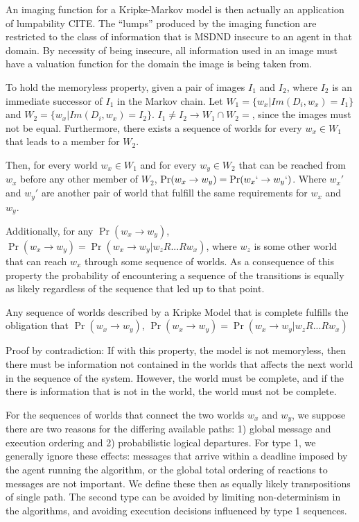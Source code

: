 An imaging function for a Kripke-Markov model is then actually an application of lumpability CITE.
The ``lumps'' produced by the imaging function are restricted to the class of information that is MSDND insecure to an agent in that domain.
By necessity of being insecure, all information used in an image must have a valuation function for the domain the image is being taken from.

To hold the memoryless property, given a pair of images $I_1$ and $I_2$, where $I_2$ is an immediate successor of $I_1$ in the Markov chain. Let $W_1 = \{ w_x | Im(D_i, w_x) = I_1 \}$ and $W_2 = \{ w_x | Im(D_i, w_x) = I_2 \}$. $I_1 \neq I_2 \rightarrow W_1 \cap W_2 = $, since the images must not be equal. Furthermore, there exists a sequence of worlds for every $w_x \in W_1$ that leads to a member for $W_2$.

Then, for every world $w_x \in W_1$ and for every $w_y \in W_2$ that can be reached from $w_x$ before any other member of $W_2$, $\Pr(w_x \rightarrow w_y) = \Pr(w_x` \rightarrow w_y`)$. Where $w_x'$ and $w_y'$ are another pair of world that fulfill the same requirements for $w_x$ and $w_y$.

Additionally, for any $\Pr(w_x \rightarrow w_y)$, $\Pr(w_x \rightarrow w_y) = \Pr(w_x \rightarrow w_y | w_{z}R...Rw_{x})$, where $w_z$ is some other world that can reach $w_x$ through some sequence of worlds. As a consequence of this property the probability of encountering a sequence of the transitions is equally as likely regardless of the sequence that led up to that point.

\begin{cor}
Any sequence of worlds described by a Kripke Model that is complete fulfills the obligation that $\Pr(w_x \rightarrow w_y)$, $\Pr(w_x \rightarrow w_y) = \Pr(w_x \rightarrow w_y | w_{z}R...Rw_{x})$
\end{cor}

Proof by contradiction: If with this property, the model is not memoryless, then there must be information not contained in the worlds that affects the next world in the sequence of the system. However, the world must be complete, and if the there is information that is not in the world, the world must not be complete.

For the sequences of worlds that connect the two worlds $w_x$ and $w_y$, we suppose there are two reasons for the differing available paths: 1) global message and execution ordering and 2) probabilistic logical departures. For type 1, we generally ignore these effects: messages that arrive within a deadline imposed by the agent running the algorithm, or the global total ordering of reactions to messages are not important. We define these then as equally likely transpositions of single path. The second type can be avoided by limiting non-determinism in the algorithms, and avoiding execution decisions influenced by type 1 sequences.

